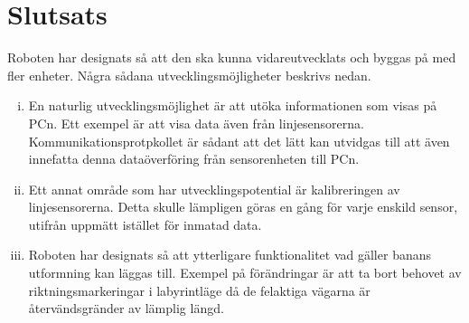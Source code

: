
%
\section{Slutsats}
Roboten har designats så att den ska kunna vidareutvecklats och byggas på med fler enheter. Några sådana utvecklingsmöjligheter beskrivs nedan. 

\begin{enumerate}[i.]
\item En naturlig utvecklingsmöjlighet är att utöka informationen som visas på PCn. Ett exempel är att visa data även från linjesensorerna. 
Kommunikationsprotpkollet är sådant att det lätt kan utvidgas till att även innefatta denna dataöverföring från sensorenheten till PCn. 
\item Ett annat område som har utvecklingspotential är kalibreringen av linjesensorerna. Detta skulle lämpligen göras en gång för varje enskild sensor, utifrån 
uppmätt istället för inmatad data. 
\item Roboten har designats så att ytterligare funktionalitet vad gäller banans utformning kan läggas till. Exempel på förändringar är att ta bort behovet av riktningsmarkeringar i labyrintläge då de felaktiga vägarna är återvändsgränder av lämplig längd. 
\end{enumerate}


